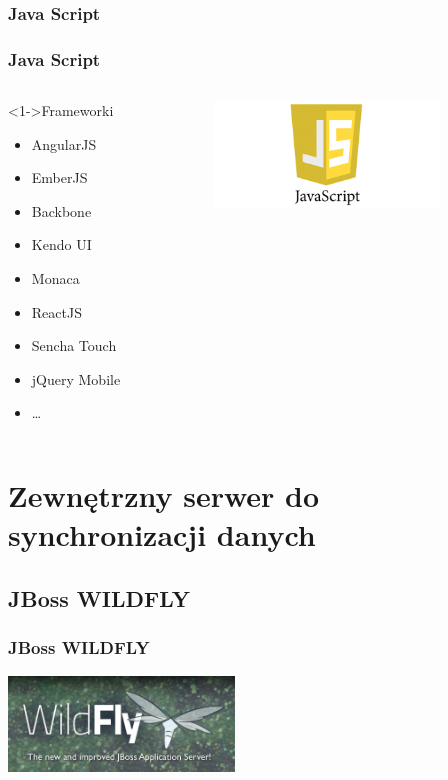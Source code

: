 \documentclass{beamer}
\begin{document}
\subsubsection{Java Script}
\begin{frame}
\frametitle{Java Script}
     \begin{columns}[T] %
      
     \begin{column}[T]{6cm} %
    \begin{block}<1->{Frameworki}
			\begin{itemize}
    \item<1-> AngularJS
    \item<2->  EmberJS
    \item<3->  Backbone
    \item<4->  Kendo UI
    \item<5-> Monaca
    \item<6->  ReactJS
    \item<6-> Sencha Touch
    \item<6->  jQuery Mobile
    \item<5-> \dots
\end{itemize}
\end{block}
     \end{column}
     \begin{column}[T]{6cm} %
          \includegraphics[width=6cm]{js.png}
     \end{column}
     \end{columns}
     
     

\end{frame}
\section{Zewnętrzny serwer do synchronizacji danych}


\subsection{JBoss WILDFLY}
\begin{frame}
\frametitle{JBoss WILDFLY}
\includegraphics[width=6cm]{wildfly.jpg}



\end{frame}
\end{document}
